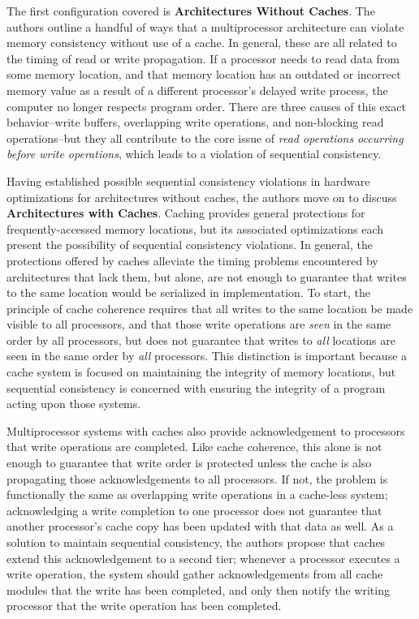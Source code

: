 \documentclass{article}
\begin{document}
\par The first configuration covered is \textbf{Architectures Without Caches}.
The authors outline a handful of ways that a multiprocessor architecture can violate memory consistency without use of a cache.
In general, these are all related to the timing of read or write propagation.
If a processor needs to read data from some memory location, and that memory location has an outdated or incorrect memory value as a result of a different processor's delayed write process, the computer no longer respects program order.
There are three causes of this exact behavior--write buffers, overlapping write operations, and non-blocking read operations--but they all contribute to the core issue of \textit{read operations occurring before write operations}, which leads to a violation of sequential consistency.

\par Having established possible sequential consistency violations in hardware optimizations for architectures without caches, the authors move on to discuss \textbf{Architectures with Caches}.
Caching provides general protections for frequently-accessed memory locations, but its associated optimizations each present the possibility of sequential consistency violations.
In general, the protections offered by caches alleviate the timing problems encountered by architectures that lack them, but alone, are not enough to guarantee that writes to the same location would be serialized in implementation.
To start, the principle of cache coherence requires that all writes to the same location be made visible to all processors, and that those write operations are \textit{seen} in the same order by all processors, but does not guarantee that writes to \textit{all} locations are seen in the same order by \textit{all} processors.
This distinction is important because a cache system is focused on maintaining the integrity of memory locations, but sequential consistency is concerned with ensuring the integrity of a program acting upon those systems.

\par Multiprocessor systems with caches also provide acknowledgement to processors that write operations are completed.
Like cache coherence, this alone is not enough to guarantee that write order is protected unless the cache is also propagating those acknowledgements to all processors.
If not, the problem is functionally the same as overlapping write operations in a cache-less system; acknowledging a write completion to one processor does not guarantee that another processor's cache copy has been updated with that data as well.
As a solution to maintain sequential consistency, the authors propose that caches extend this acknowledgement to a second tier; whenever a processor executes a write operation, the system should gather acknowledgements from all cache modules that the write has been completed, and only then notify the writing processor that the write operation has been completed.
\end{document}
